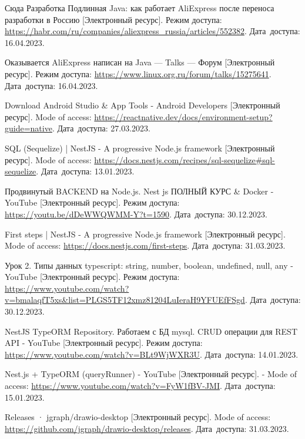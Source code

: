 \begin{thebibliography}{}
    Сюда Разработка Подлинная Java: как работает AliExpress после переноса разработки в Россию
    [Электронный ресурс].
    Режим доступа: \url{https://habr.com/ru/companies/aliexpress_russia/articles/552382}.
    Дата~доступа: 16.04.2023.

    Оказывается AliExpress написан на Java — Talks — Форум
    [Электронный ресурс].
    Режим доступа: \url{https://www.linux.org.ru/forum/talks/15275641}.
    Дата~доступа: 16.04.2023.

    Download Android Studio \& App Tools - Android Developers
    [Электронный ресурс].
    Mode of access: \url{https://reactnative.dev/docs/environment-setup?guide=native}.
    Дата~доступа: 27.03.2023.

    SQL (Sequelize) | NestJS - A progressive Node.js framework
    [Электронный ресурс].
    Mode of access: \url{https://docs.nestjs.com/recipes/sql-sequelize#sql-sequelize}.
    Дата~доступа: 13.01.2023.

    Продвинутый BACKEND на Node.js. Nest js ПОЛНЫЙ КУРС \& Docker - YouTube
    [Электронный ресурс].
    Режим доступа: \url{https://youtu.be/dDeWWQWMM-Y?t=1590}.
    Дата~доступа: 30.12.2023.

    First steps | NestJS - A progressive Node.js framework
    [Электронный ресурс].
    Mode of access: \url{https://docs.nestjs.com/first-steps}.
    Дата~доступа: 31.03.2023.

    Урок 2. Типы данных typescript: string, number, boolean, undefined, null, any - YouTube
    [Электронный ресурс].
    Режим доступа: \url{https://www.youtube.com/watch?v=bmalaqfT5xs&list=PLGS5TF12xmz81204LuIeraH9YFUEfFSgd}.
    Дата~доступа: 30.12.2023.

    NestJS TypeORM Repository. Работаем с БД mysql. CRUD операции для REST API - YouTube
    [Электронный ресурс].
    Режим доступа: \url{https://www.youtube.com/watch?v=BLt9WjWXR3U}.
    Дата~доступа: 14.01.2023.

    Nest.js + TypeORM (queryRunner) - YouTube
    [Электронный ресурс]. -
    Mode of access: \url{https://www.youtube.com/watch?v=FyW1fBV-JMI}.
    Дата~доступа: 15.01.2023.

    Releases · jgraph/drawio-desktop
    [Электронный ресурс].
    Mode of access: \url{https://github.com/jgraph/drawio-desktop/releases}.
    Дата~доступа: 31.03.2023.


\end{thebibliography}
